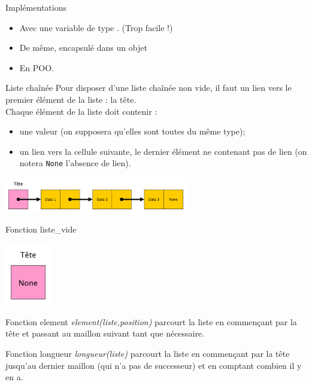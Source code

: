 \documentclass[10pt]{beamer}
\begin{document}
\begin{frame}{Implémentations}
	\begin{itemize}
    	\item	Avec une variable de type . (Trop facile !)
    	\item	De même, encapsulé dans un objet
        \item 	En POO.
    \end{itemize}
\end{frame}

\begin{frame}[fragile]{Liste chaînée}
	Pour disposer d'une liste chaînée non vide, il faut un lien vers le premier élément de la liste : la tête.\\
	Chaque élément de la liste doit contenir :
	\begin{itemize}
		\item une valeur (on supposera qu'elles sont toutes du même type);
		\item un lien vers la cellule suivante, le dernier élément ne contenant pas de lien (on notera \texttt{None} l'absence de lien).
	\end{itemize}
	\begin{center}
	\includegraphics[width=8cm]{img/liste_chainee1}
	\end{center}
\end{frame}
\begin{frame}{Fonction liste\_vide}
	\begin{center}
		\includegraphics[width=2cm]{img/liste_vide}
	\end{center}
\end{frame}
\begin{frame}{Fonction element}
	\textit{element(liste,position)} parcourt la liste en commençant par la tête et passant au maillon suivant tant que nécessaire.
\end{frame}
\begin{frame}{Fonction longueur}
	\textit{longueur(liste)} parcourt la liste en commençant par la tête jusqu'au dernier maillon (qui n'a pas de successeur) et en comptant combien il y en a.
\end{frame}
\end{document}
